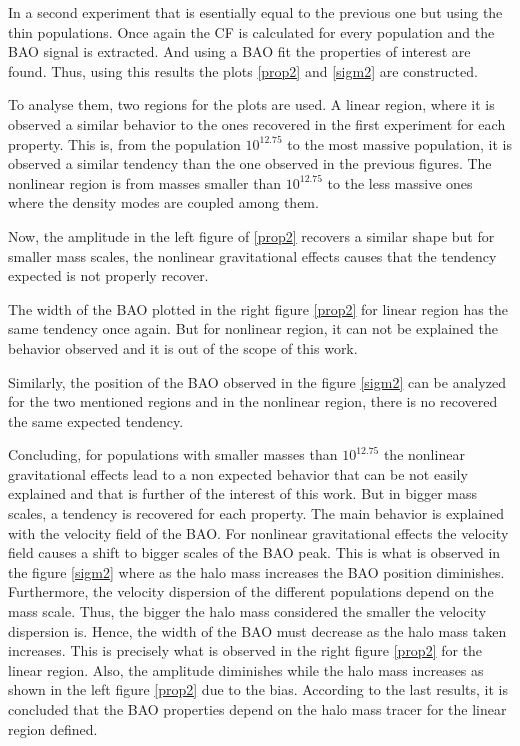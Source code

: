 		
In a second experiment that is esentially equal to the previous one but using the 
thin populations. 
Once again the CF is calculated for every population and the BAO signal is extracted. 
And using a BAO fit the properties of interest are found. Thus, using this results the 
plots \ref{prop2} and \ref{sigm2} are constructed. 

To analyse them, two regions for the plots are used. A linear region, where it is observed
a similar behavior to the ones recovered in the first experiment for each property. This is, 
from the population $10^{12.75}$ to the most massive population, it is observed a similar 
tendency than the one observed in the previous figures. 
The nonlinear region is from masses smaller than $10^{12.75}$  to the less massive ones where
the density modes are coupled among them. 

Now, the amplitude in the left figure of \ref{prop2} recovers a similar shape but
for smaller mass scales, the nonlinear gravitational effects causes that the tendency
expected is not properly recover. 	

The width of the BAO plotted in the right figure \ref{prop2} for linear region has the 
same tendency once again. But for nonlinear region, it can not be explained the behavior 
observed and it is out of the scope of this work.

Similarly, the position of the BAO observed in the figure \ref{sigm2} can be analyzed
for the two mentioned regions and in the nonlinear region, there is no recovered the 
same expected tendency. 

Concluding, for populations with smaller masses than $10^{12.75}$ the nonlinear gravitational
effects lead to a non expected behavior that can be not easily explained and that is further
of the interest of this work. But in bigger mass scales, a tendency is recovered for each
property. The main behavior is explained with the velocity field of the BAO. 
For nonlinear gravitational effects the velocity field causes a shift to bigger scales 
of the BAO peak. This is what is observed in the figure \ref{sigm2} where as the halo mass 
increases the BAO position diminishes. Furthermore, the velocity dispersion of the different
populations depend on the mass scale. Thus, the bigger the halo mass considered the smaller
the velocity dispersion is. Hence, the width of the BAO must decrease as the halo mass taken
increases. This is precisely what is observed in the right figure \ref{prop2} for the linear region. 
Also, the amplitude diminishes while the halo mass increases as shown in the left 
figure \ref{prop2} due to the bias. 
According to the last results, it is concluded that the BAO properties depend on the 
halo mass tracer for the linear region defined. 







